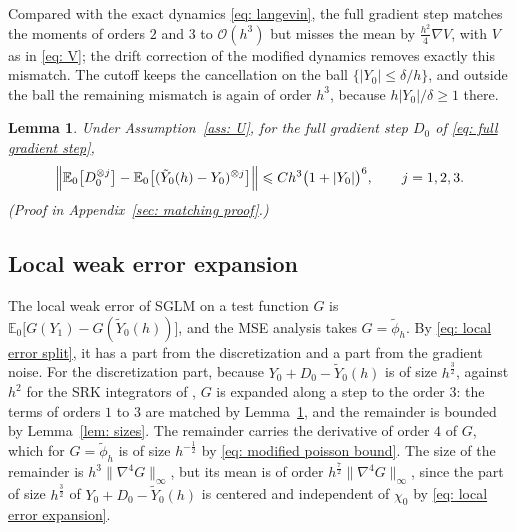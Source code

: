 \documentclass{article}
\newtheorem{lemma}{Lemma}
\newcommand{\Le}{\leqslant}
\newcommand{\Ge}{\geqslant}
\newcommand{\norm}[1]{\lVert #1 \rVert}
\numberwithin{equation}{section}
\begin{document}
Compared with the exact dynamics \eqref{eq: langevin}, the full gradient step matches the moments of orders $2$ and $3$ to $\mathcal O(h^3)$ but misses the mean by $\frac{h^2}{4}\nabla V$, with $V$ as in \eqref{eq: V}; the drift correction of the modified dynamics removes exactly this mismatch. The cutoff keeps the cancellation on the ball $\{|Y_0| \Le \delta/h\}$, and outside the ball the remaining mismatch is again of order $h^3$, because $h|Y_0|/\delta \Ge 1$ there.

\begin{lemma}
\label{lem: moment matching}
    Under Assumption~\ref{ass: U}, for the full gradient step $D_0$ of \eqref{eq: full gradient step},
    \begin{equation}
        \Bigl\| \mathbb E_0\bigl[ D_0^{\otimes j} \bigr] - \mathbb E_0\bigl[ (\tilde Y_0(h) - Y_0)^{\otimes j} \bigr] \Bigr\| \Le C h^3 \bigl( 1 + |Y_0| \bigr)^{6} , \qquad j = 1, 2, 3 .
        \label{eq: moment matching}
    \end{equation}
    \emph{(Proof in Appendix~\ref{sec: matching proof}.)}
\end{lemma}

\subsection{Local weak error expansion}
\label{subsec: weak expansion}

The local weak error of SGLM on a test function $G$ is $\mathbb E_0\bigl[ G(Y_1) - G(\tilde Y_0(h)) \bigr]$, and the MSE analysis takes $G = \tilde\phi_h$. By \eqref{eq: local error split}, it has a part from the discretization and a part from the gradient noise. For the discretization part, because $Y_0 + D_0 - \tilde Y_0(h)$ is of size $h^{\frac32}$, against $h^2$ for the SRK integrators of \citep{ye2026mse}, $G$ is expanded along a step to the order $3$: the terms of orders $1$ to $3$ are matched by Lemma~\ref{lem: moment matching}, and the remainder is bounded by Lemma~\ref{lem: sizes}. The remainder carries the derivative of order $4$ of $G$, which for $G = \tilde\phi_h$ is of size $h^{-\frac12}$ by \eqref{eq: modified poisson bound}. The size of the remainder is $h^3 \norm{\nabla^4 G}_\infty$, but its mean is of order $h^{\frac72} \norm{\nabla^4 G}_\infty$, since the part of size $h^{\frac32}$ of $Y_0 + D_0 - \tilde Y_0(h)$ is centered and independent of $\chi_0$ by \eqref{eq: local error expansion}.
\end{document}
